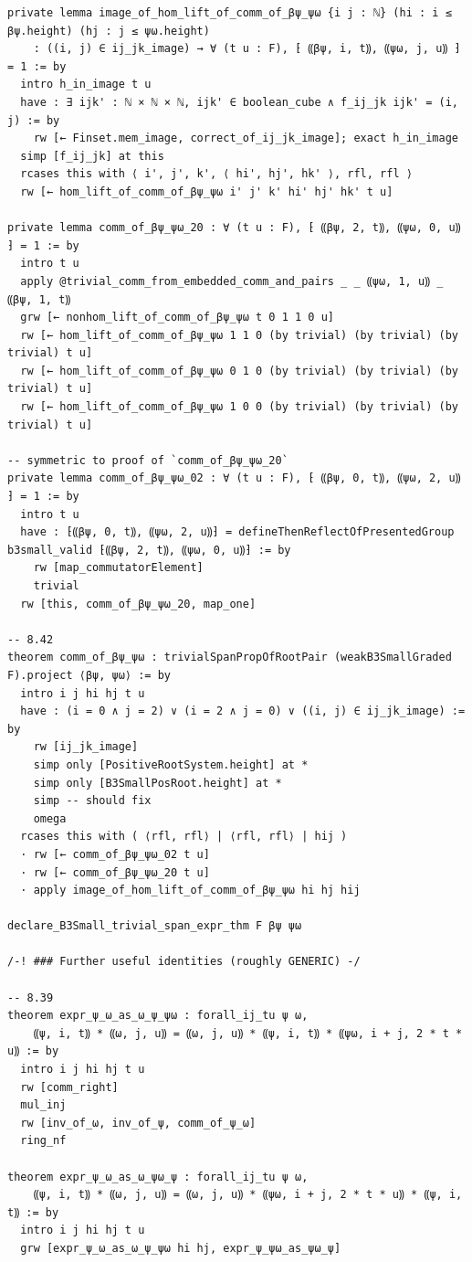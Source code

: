 \documentclass[10pt,a4paper]{article}
\begin{document}
\begin{Verbatim}
private lemma image_of_hom_lift_of_comm_of_βψ_ψω {i j : ℕ} (hi : i ≤ βψ.height) (hj : j ≤ ψω.height)
    : ((i, j) ∈ ij_jk_image) → ∀ (t u : F), ⁅ ⸨βψ, i, t⸩, ⸨ψω, j, u⸩ ⁆ = 1 := by
  intro h_in_image t u
  have : ∃ ijk' : ℕ × ℕ × ℕ, ijk' ∈ boolean_cube ∧ f_ij_jk ijk' = (i, j) := by
    rw [← Finset.mem_image, correct_of_ij_jk_image]; exact h_in_image
  simp [f_ij_jk] at this
  rcases this with ⟨ i', j', k', ⟨ hi', hj', hk' ⟩, rfl, rfl ⟩
  rw [← hom_lift_of_comm_of_βψ_ψω i' j' k' hi' hj' hk' t u]

private lemma comm_of_βψ_ψω_20 : ∀ (t u : F), ⁅ ⸨βψ, 2, t⸩, ⸨ψω, 0, u⸩ ⁆ = 1 := by
  intro t u
  apply @trivial_comm_from_embedded_comm_and_pairs _ _ ⸨ψω, 1, u⸩ _ ⸨βψ, 1, t⸩
  grw [← nonhom_lift_of_comm_of_βψ_ψω t 0 1 1 0 u]
  rw [← hom_lift_of_comm_of_βψ_ψω 1 1 0 (by trivial) (by trivial) (by trivial) t u]
  rw [← hom_lift_of_comm_of_βψ_ψω 0 1 0 (by trivial) (by trivial) (by trivial) t u]
  rw [← hom_lift_of_comm_of_βψ_ψω 1 0 0 (by trivial) (by trivial) (by trivial) t u]

-- symmetric to proof of `comm_of_βψ_ψω_20`
private lemma comm_of_βψ_ψω_02 : ∀ (t u : F), ⁅ ⸨βψ, 0, t⸩, ⸨ψω, 2, u⸩ ⁆ = 1 := by
  intro t u
  have : ⁅⸨βψ, 0, t⸩, ⸨ψω, 2, u⸩⁆ = defineThenReflectOfPresentedGroup b3small_valid ⁅⸨βψ, 2, t⸩, ⸨ψω, 0, u⸩⁆ := by
    rw [map_commutatorElement]
    trivial
  rw [this, comm_of_βψ_ψω_20, map_one]

-- 8.42
theorem comm_of_βψ_ψω : trivialSpanPropOfRootPair (weakB3SmallGraded F).project ⟨βψ, ψω⟩ := by
  intro i j hi hj t u
  have : (i = 0 ∧ j = 2) ∨ (i = 2 ∧ j = 0) ∨ ((i, j) ∈ ij_jk_image) := by
    rw [ij_jk_image]
    simp only [PositiveRootSystem.height] at *
    simp only [B3SmallPosRoot.height] at *
    simp -- should fix
    omega
  rcases this with ( ⟨rfl, rfl⟩ | ⟨rfl, rfl⟩ | hij )
  · rw [← comm_of_βψ_ψω_02 t u]
  · rw [← comm_of_βψ_ψω_20 t u]
  · apply image_of_hom_lift_of_comm_of_βψ_ψω hi hj hij

declare_B3Small_trivial_span_expr_thm F βψ ψω

/-! ### Further useful identities (roughly GENERIC) -/

-- 8.39
theorem expr_ψ_ω_as_ω_ψ_ψω : forall_ij_tu ψ ω,
    ⸨ψ, i, t⸩ * ⸨ω, j, u⸩ = ⸨ω, j, u⸩ * ⸨ψ, i, t⸩ * ⸨ψω, i + j, 2 * t * u⸩ := by
  intro i j hi hj t u
  rw [comm_right]
  mul_inj
  rw [inv_of_ω, inv_of_ψ, comm_of_ψ_ω]
  ring_nf

theorem expr_ψ_ω_as_ω_ψω_ψ : forall_ij_tu ψ ω,
    ⸨ψ, i, t⸩ * ⸨ω, j, u⸩ = ⸨ω, j, u⸩ * ⸨ψω, i + j, 2 * t * u⸩ * ⸨ψ, i, t⸩ := by
  intro i j hi hj t u
  grw [expr_ψ_ω_as_ω_ψ_ψω hi hj, expr_ψ_ψω_as_ψω_ψ]


\end{Verbatim}
\end{document}
